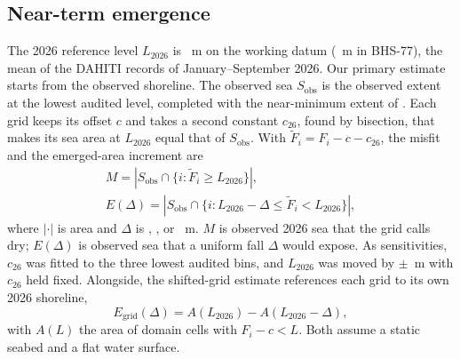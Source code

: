\subsection{Near-term emergence}
\label{sec:nearterm}
The 2026 reference level $L_{2026}$ is ~m on the working datum (~m in BHS-77), the mean of the  DAHITI records of January--September 2026. Our primary estimate starts from the observed shoreline. The observed sea $S_{\mathrm{obs}}$ is the observed extent at the lowest audited level, completed with the near-minimum extent of . Each grid keeps its offset $c$ and takes a second constant $c_{26}$, found by bisection, that makes its sea area at $L_{2026}$ equal that of $S_{\mathrm{obs}}$. With $\tilde{F}_i = F_i - c - c_{26}$, the misfit and the emerged-area increment are
\begin{gather}
  M = \left\lvert S_{\mathrm{obs}} \cap \{ i : \tilde{F}_i \ge L_{2026} \} \right\rvert , \label{eq:misfit} \\
  E(\Delta) = \left\lvert S_{\mathrm{obs}} \cap \{ i : L_{2026} - \Delta \le \tilde{F}_i < L_{2026} \} \right\rvert ,
  \label{eq:emerged_obs}
\end{gather}
where $\lvert\cdot\rvert$ is area and $\Delta$ is , ,  or ~m. $M$ is observed 2026 sea that the grid calls dry; $E(\Delta)$ is observed sea that a uniform fall $\Delta$ would expose. As sensitivities, $c_{26}$ was fitted to the three lowest audited bins, and $L_{2026}$ was moved by $\pm$~m with $c_{26}$ held fixed. Alongside, the shifted-grid estimate references each grid to its own 2026 shoreline,
\begin{equation}
  E_{\mathrm{grid}}(\Delta) = A(L_{2026}) - A(L_{2026} - \Delta) ,
  \label{eq:emerged_grid}
\end{equation}
with $A(L)$ the area of domain cells with $F_i - c < L$. Both assume a static seabed and a flat water surface.

